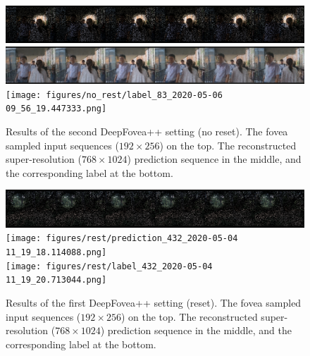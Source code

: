 \documentclass[10pt,twocolumn,letterpaper]{article}
\begin{document}
\begin{figure}[htbp!]
    \centering
    \includegraphics[width=\columnwidth]{figures/no_rest/input_83_2020-05-06 09_56_21.383738.png}\\\vspace{-0.1cm}
    \includegraphics[width=\columnwidth]{figures/no_rest/prediction_83_2020-05-06 09_56_17.234900.png}\\\vspace{-0.1cm}
    \texttt{[image: figures/no\_rest/label\_83\_2020-05-06 09\_56\_19.447333.png]}\\
    \caption{Results of the second DeepFovea++ setting (no reset). The fovea sampled input sequences ($192 \times 256$) on the top. The reconstructed super-resolution ($768 \times 1024$) prediction sequence in the middle, and the corresponding label at the bottom.}
    \label{fig:norestresults1}
\end{figure}

\begin{figure}[htbp!]
    \centering
    \includegraphics[width=\columnwidth]{figures/rest/input_432_2020-05-04 11_19_22.304534.png}\\\vspace{-0.1cm}
    \texttt{[image: figures/rest/prediction\_432\_2020-05-04 11\_19\_18.114088.png]}\\\vspace{-0.1cm}
    \texttt{[image: figures/rest/label\_432\_2020-05-04 11\_19\_20.713044.png]}\\
    \caption{Results of the first DeepFovea++ setting (reset). The fovea sampled input sequences ($192 \times 256$) on the top. The reconstructed super-resolution ($768 \times 1024$) prediction sequence in the middle, and the corresponding label at the bottom.}
    \label{fig:restresults2}
\end{figure}
\end{document}
